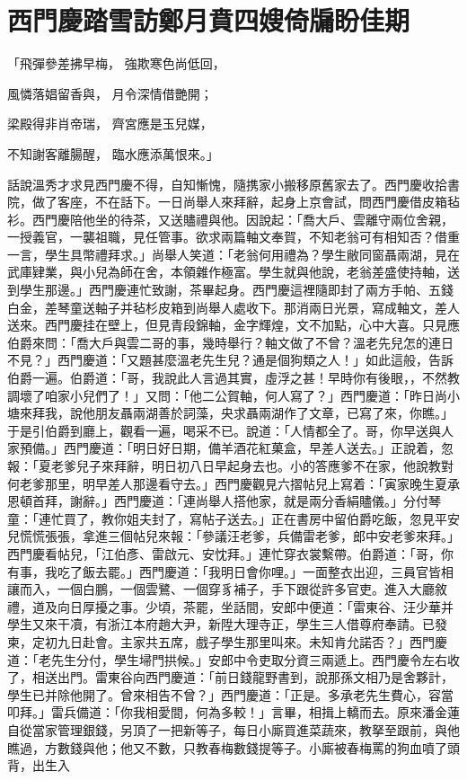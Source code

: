 %

\chapter{西門慶踏雪訪鄭月\KG 賁四嫂倚牖盼佳期}


「飛彈參差拂早梅，  強欺寒色尚低回，

風憐落娼留香與，  月令深情借艷開；

梁殿得非肖帝瑞，  齊宮應是玉兒媒，

不知謝客離腸醒，  臨水應添萬恨來。」

話說溫秀才求見西門慶不得，自知慚愧，隨携家小搬移原舊家去了。西門慶收拾書院，做了客座，不在話下。一日尚舉人來拜辭，起身上京會試，問西門慶借皮箱毡衫。西門慶陪他坐的待茶，又送贐禮與他。因說起：「喬大戶、雲離守兩位舍親，一授義官，一襲祖職，見任管事。欲求兩篇軸文奉賀，不知老翁可有相知否？借重一言，學生具幣禮拜求。」尚舉人笑道：「老翁何用禮為？學生敝同窗聶兩湖，見在武庫肄業，與小兒為師在舍，本領雜作極富。學生就與他說，老翁差盛使持軸，送到學生那邊。」西門慶連忙致謝，茶畢起身。西門慶這裡隨即封了兩方手帕、五錢白金，差琴童送軸子并毡杉皮箱到尚舉人處收下。那消兩日光景，寫成軸文，差人送來。西門慶挂在壁上，但見青段錦軸，金字輝煌，文不加點，心中大喜。只見應伯爵來問：「喬大戶與雲二哥的事，幾時舉行？軸文做了不曾？溫老先兒怎的連日不見？」西門慶道：「又題甚麼溫老先生兒？通是個狗類之人！」如此這般，告訴伯爵一遍。伯爵道：「哥，我說此人言過其實，虛浮之甚！早時你有後眼，，不然教調壞了咱家小兒們了！」又問：「他二公賀軸，何人寫了？」西門慶道：「昨日尚小塘來拜我，說他朋友聶兩湖善於詞藻，央求聶兩湖作了文章，已寫了來，你瞧。」于是引伯爵到廳上，觀看一遍，喝采不已。說道：「人情都全了。哥，你早送與人家預備。」西門慶道：「明日好日期，備羊酒花紅菓盒，早差人送去。」正說着，忽報：「夏老爹兒子來拜辭，明日初八日早起身去也。小的答應爹不在家，他說教對何老爹那里，明早差人那邊看守去。」西門慶觀見六摺帖兒上寫着：「寅家晚生夏承恩頓首拜，謝辭。」西門慶道：「連尚舉人搭他家，就是兩分香絹贐儀。」分付琴童：「連忙買了，教你姐夫封了，寫帖子送去。」正在書房中留伯爵吃飯，忽見平安兒慌慌張張，拿進三個帖兒來報：「參議汪老爹，兵備雷老爹，郎中安老爹來拜。」西門慶看帖兒，「江伯彥、雷啟元、安忱拜。」連忙穿衣裳繫帶。伯爵道：「哥，你有事，我吃了飯去罷。」西門慶道：「我明日會你哩。」一面整衣出迎，三員官皆相讓而入，一個白鵬，一個雲鷺、一個穿豸補子，手下跟從許多官吏。進入大廳敘禮，道及向日厚擾之事。少頃，茶罷，坐話間，安郎中便道：「雷東谷、汪少華并學生又來干凟，有浙江本府趙大尹，新陞大理寺正，學生三人借尊府奉請。已發柬，定初九日赴會。主家共五席，戲子學生那里叫來。未知肯允諾否？」西門慶道：「老先生分付，學生埽門拱候。」安郎中令吏取分資三兩遞上。西門慶令左右收了，相送出門。雷東谷向西門慶道：「前日錢龍野書到，說那孫文相乃是舍夥計，學生已并除他開了。曾來相告不曾？」西門慶道：「正是。多承老先生費心，容當叩拜。」雷兵備道：「你我相愛間，何為多較！」言畢，相揖上轎而去。原來潘金蓮自從當家管理銀錢，另頂了一把新等子，每日小廝買進菜蔬來，教拏至跟前，與他瞧過，方數錢與他；他又不數，只教春梅數錢提等子。小廝被春梅罵的狗血噴了頭背，出生入